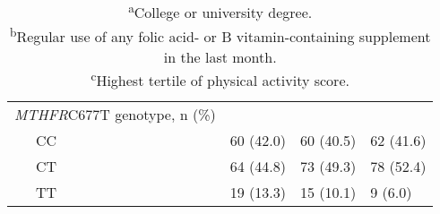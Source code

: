 \begin{table}
\begin{adjustbox}{width=\textwidth}
\begin{tabular}{L{4.8cm}C{3.5cm}C{3.5cm}C{3.5cm}}
{\textit{MTHFR}}{C677T genotype, n (\%)} & ~ & ~ & ~ \\
 \ \ \ CC & 60 (42.0) & 60 (40.5) & 62 (41.6)\\
 \ \ \ CT & 64 (44.8) & 73 (49.3) & 78 (52.4)\\
 \ \ \ TT & 19 (13.3) & 15 (10.1) & 9 (6.0)\\
\hline
\end{tabular}
\end{adjustbox}
\caption*{\footnotesize{\textsuperscript{a}College or university degree.\\\textsuperscript{b}Regular use of any folic acid- or B vitamin-containing supplement in the last month.\\\textsuperscript{c}Highest tertile of physical activity score.}}
\end{table}

